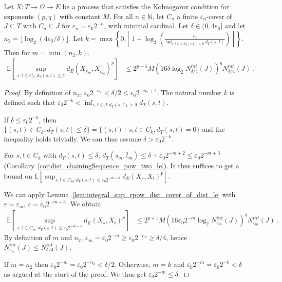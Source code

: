 \begin{lemma}\label{lem:integral_sup_rpow_dist_cover_rescale}
  \leanok
Let $X : T \to \Omega \to E$ be a process that satisfies the Kolmogorov condition for exponents $(p,q)$ with constant $M$.
For all $n \in \mathbb{N}$, let $C_n$ a finite $\varepsilon_n$-cover of $J \subseteq T$ with $C_n \subseteq J$ for $\varepsilon_n = \varepsilon_0 2^{-n}$, with minimal cardinal.
Let $\delta \in (0, 4 \varepsilon_0]$ and let $n_2 = \lfloor \log_2(4\varepsilon_0/\delta) \rfloor$.
Let $k = \max \left\{ 0, \left\lceil 1 + \log_2\left(\frac{\varepsilon_0}{\inf_{s, t \in J; d_T(s,t)>0}d_T(s, t)}\right) \right\rceil \right\}$.
Then for $m = \min(n_2, k)$,
\begin{align*}
  \mathbb{E} \left[ \sup_{s, t \in C_k; d_T(s, t) \le \delta} d_E(X_{\bar{s}_m}, X_{\bar{t}_m})^p \right]
  &\le 2^{p+1} M \left(16 \delta \log_2 N^{int}_{\delta/4}(J) \right)^q  N^{int}_{\delta/4}(J)
  \: .
\end{align*}
\end{lemma}

\begin{proof}
By definition of $n_2$, $\varepsilon_0 2^{-n_2} < \delta/2 \le \varepsilon_0 2^{-n_2+1}$.
The natural number $k$ is defined such that $\varepsilon_0 2^{-k} < \inf_{s, t \in J; d_T(s,t)>0}d_T(s, t)$.

If $\delta \le \varepsilon_0 2^{-k}$, then $\{(s, t) \in C_k; d_T(s, t) \le \delta\} = \{(s, t) \mid s,t \in C_k, d_T(s,t) = 0\}$ and the inequality holds trivially.
We can thus assume $\delta > \varepsilon_0 2^{-k}$.

For $s, t \in C_k$ with $d_T(s, t) \le \delta$, $d_T(\bar{s}_m, \bar{t}_m) \le \delta + \varepsilon_0 2^{-m+2} \le \varepsilon_0 2^{-m+3}$ (Corollary~\ref{cor:dist_chainingSequence_pow_two_le}).
It thus suffices to get a bound on $\mathbb{E} \left[ \sup_{s, t \in C_m; d_T(s, t) \le \varepsilon_0 2^{-m+3}} d_E(X_s, X_t)^p \right]$.

We can apply Lemma~\ref{lem:integral_sup_rpow_dist_cover_of_dist_le} with $\varepsilon = \varepsilon_m$, $c = \varepsilon_0 2^{-m+3}$. We obtain
\begin{align*}
  \mathbb{E} \left[ \sup_{s, t \in C_m; d_T(s, t) \le \varepsilon_0 2^{-m+3}} d_E(X_s, X_t)^p \right]
  &\le 2^{p+1} M \left(16 \varepsilon_0 2^{-m} \log_2 N^{int}_{\varepsilon_m}(J) \right)^q  N^{int}_{\varepsilon_m}(J)
  \: .
\end{align*}
By definition of $m$ and $n_2$, $\varepsilon_m = \varepsilon_0 2^{-m} \ge \varepsilon_0 2^{-n_2} \ge \delta/4$,
hence $N^{int}_{\varepsilon_m}(J) \le N^{int}_{\delta / 4}(J)$.

If $m = n_2$ then $\varepsilon_0 2^{-m} = \varepsilon_0 2^{-n_2} < \delta/2$.
Otherwise, $m = k$ and $\varepsilon_0 2^{-m} = \varepsilon_0 2^{-k} < \delta$ as argued at the start of the proof.
We thus get $\varepsilon_0 2^{-m} \le \delta$.

\end{proof}



